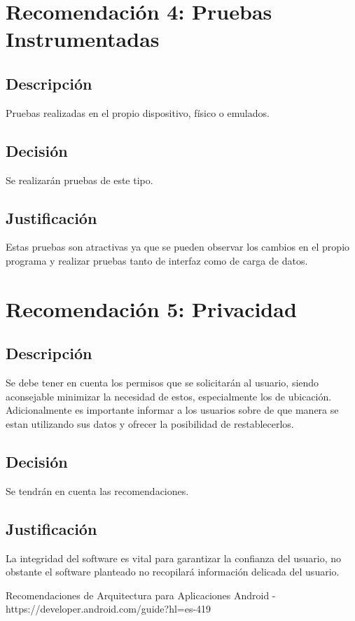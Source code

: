 \documentclass{article}
\begin{document}
    \section{Recomendación 4: Pruebas Instrumentadas}
        \subsection{Descripción}
        Pruebas realizadas en el propio dispositivo, físico o emulados.

        \subsection{Decisión}
        Se realizarán pruebas de este tipo.

        \subsection{Justificación}
        Estas pruebas son atractivas ya que se pueden observar los cambios en el propio programa y realizar
         pruebas tanto de interfaz como de carga de datos.

    \section{Recomendación 5: Privacidad}
        \subsection{Descripción}
        Se debe tener en cuenta los permisos que se solicitarán al usuario, siendo aconsejable minimizar la
         necesidad de estos, especialmente los de ubicación. Adicionalmente es importante informar a los
         usuarios sobre de que manera se estan utilizando sus datos y ofrecer la posibilidad de restablecerlos.

        \subsection{Decisión}
        Se tendrán en cuenta las recomendaciones.

        \subsection{Justificación}
        La integridad del software es vital para garantizar la confianza del usuario, no obstante el 
         software planteado no recopilará información delicada del usuario.

    \begin{thebibliography}{}
         Recomendaciones de Arquitectura para Aplicaciones Android - https://developer.android.com/guide?hl=es-419
    \end{thebibliography}
        
\end{document}
